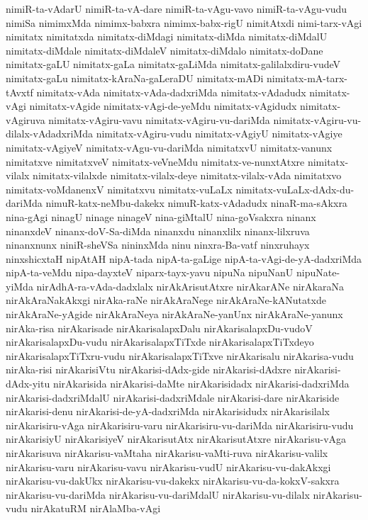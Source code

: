 {nimiR-ta-vAdarU
nimiR-ta-vA-dare
nimiR-ta-vAgu-vavo
nimiR-ta-vAgu-vudu
nimiSa
nimimxMda
nimimx-babxra
nimimx-babx-rigU
nimitAtxdi
nimi-tarx-vAgi
nimitatx
nimitatxda
nimitatx-diMdagi
nimitatx-diMda
nimitatx-diMdalU
nimitatx-diMdale
nimitatx-diMdaleV
nimitatx-diMdalo
nimitatx-doDane
nimitatx-gaLU
nimitatx-gaLa
nimitatx-gaLiMda
nimitatx-galilalxdiru-vudeV
nimitatx-gaLu
nimitatx-kAraNa-gaLeraDU
nimitatx-mADi
nimitatx-mA-tarx-tAvxtf
nimitatx-vAda
nimitatx-vAda-dadxriMda
nimitatx-vAdadudx
nimitatx-vAgi
nimitatx-vAgide
nimitatx-vAgi-de-yeMdu
nimitatx-vAgidudx
nimitatx-vAgiruva
nimitatx-vAgiru-vavu
nimitatx-vAgiru-vu-dariMda
nimitatx-vAgiru-vu-dilalx-vAdadxriMda
nimitatx-vAgiru-vudu
nimitatx-vAgiyU
nimitatx-vAgiye
nimitatx-vAgiyeV
nimitatx-vAgu-vu-dariMda
nimitatxvU
nimitatx-vanunx
nimitatxve
nimitatxveV
nimitatx-veVneMdu
nimitatx-ve-nunxtAtxre
nimitatx-vilalx
nimitatx-vilalxde
nimitatx-vilalx-deye
nimitatx-vilalx-vAda
nimitatxvo
nimitatx-voMdanenxV
nimitatxvu
nimitatx-vuLaLx
nimitatx-vuLaLx-dAdx-du-dariMda
nimuR-katx-neMbu-dakekx
nimuR-katx-vAdadudx
ninaR-ma-sAkxra
nina-gAgi
ninagU
ninage
ninageV
nina-giMtalU
nina-goVsakxra
ninanx
ninanxdeV
ninanx-doV-Sa-diMda
ninanxdu
ninanxlilx
ninanx-lilxruva
ninanxnunx
niniR-sheVSa
nininxMda
ninu
ninxra-Ba-vatf
ninxruhayx
ninxshicxtaH
nipAtAH
nipA-tada
nipA-ta-gaLige
nipA-ta-vAgi-de-yA-dadxriMda
nipA-ta-veMdu
nipa-dayxteV
niparx-tayx-yavu
nipuNa
nipuNanU
nipuNate-yiMda
nirAdhA-ra-vAda-dadxlalx
nirAkArisutAtxre
nirAkarANe
nirAkaraNa
nirAkAraNakAkxgi
nirAka-raNe
nirAkAraNege
nirAkAraNe-kANutatxde
nirAkAraNe-yAgide
nirAkAraNeya
nirAkAraNe-yanUnx
nirAkAraNe-yanunx
nirAka-risa
nirAkarisade
nirAkarisalapxDalu
nirAkarisalapxDu-vudoV
nirAkarisalapxDu-vudu
nirAkarisalapxTiTxde
nirAkarisalapxTiTxdeyo
nirAkarisalapxTiTxru-vudu
nirAkarisalapxTiTxve
nirAkarisalu
nirAkarisa-vudu
nirAka-risi
nirAkarisiVtu
nirAkarisi-dAdx-gide
nirAkarisi-dAdxre
nirAkarisi-dAdx-yitu
nirAkarisida
nirAkarisi-daMte
nirAkarisidadx
nirAkarisi-dadxriMda
nirAkarisi-dadxriMdalU
nirAkarisi-dadxriMdale
nirAkarisi-dare
nirAkariside
nirAkarisi-denu
nirAkarisi-de-yA-dadxriMda
nirAkarisidudx
nirAkarisilalx
nirAkarisiru-vAga
nirAkarisiru-varu
nirAkarisiru-vu-dariMda
nirAkarisiru-vudu
nirAkarisiyU
nirAkarisiyeV
nirAkarisutAtx
nirAkarisutAtxre
nirAkarisu-vAga
nirAkarisuva
nirAkarisu-vaMtaha
nirAkarisu-vaMti-ruva
nirAkarisu-valilx
nirAkarisu-varu
nirAkarisu-vavu
nirAkarisu-vudU
nirAkarisu-vu-dakAkxgi
nirAkarisu-vu-dakUkx
nirAkarisu-vu-dakekx
nirAkarisu-vu-da-kokxV-sakxra
nirAkarisu-vu-dariMda
nirAkarisu-vu-dariMdalU
nirAkarisu-vu-dilalx
nirAkarisu-vudu
nirAkatuRM
nirAlaMba-vAgi
}
